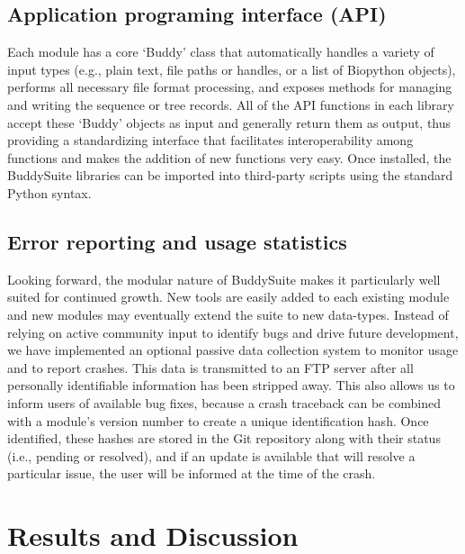 \documentclass[twocolumn]{bmcart}%
\begin{document}
\subsection*{Application programing interface (API)}
Each module has a core `Buddy' class that automatically handles a variety of input types (e.g., plain text, file paths or handles, or a list of Biopython objects), performs all necessary file format processing, and exposes methods for managing and writing the sequence or tree records. All of the API functions in each library accept these `Buddy' objects as input and generally return them as output, thus providing a standardizing interface that facilitates interoperability among functions and makes the addition of new functions very easy. Once installed, the BuddySuite libraries can be imported into third-party scripts using the standard Python syntax.

\subsection*{Error reporting and usage statistics}
Looking forward, the modular nature of BuddySuite makes it particularly well suited for continued growth. New tools are easily added to each existing module and new modules may eventually extend the suite to new data-types. Instead of relying on active community input to identify bugs and drive future development, we have implemented an optional passive data collection system to monitor usage and to report crashes. This data is transmitted to an FTP server after all personally identifiable information has been stripped away. This also allows us to inform users of available bug fixes, because a crash traceback can be combined with a module's version number to create a unique identification hash. Once identified, these hashes are stored in the Git repository along with their status (i.e., pending or resolved), and if an update is available that will resolve a particular issue, the user will be informed at the time of the crash. 

\section*{Results and Discussion}
\end{document}
